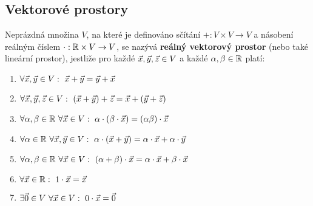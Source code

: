 \subsection{Vektorové prostory}

\begin{df}
\label{df:vekt_prostor}
Neprázdná množina $V$, na které je definováno sčítání $+:V\times V\to V$ a násobení reálným číslem $\cdot:\mathbb R\times V\rightarrow V$, se nazývá {\bf reálný vektorový prostor} (nebo také lineární prostor), jestliže pro každé $\vec{x}, \vec{y}, \vec{z}\in V$ a každé $\alpha,\beta\in\mathbb R$ platí:
\begin{enumerate}
\item $\forall\vec{x},\vec{y}\in V:~\vec{x}+\vec{y}=\vec{y}+\vec{x}$ 
\item $\forall\vec{x},\vec{y},\vec{z}\in V:~(\vec{x}+\vec{y})+\vec{z}=\vec{x}+(\vec{y}+\vec{z})$ 
\item $\forall\alpha,\beta\in\mathbb R~\forall\vec{x}\in V:~\alpha\cdot(\beta\cdot\vec{x})=(\alpha\beta)\cdot\vec{x}$ 
\item $\forall\alpha\in\mathbb R~\forall\vec{x},\vec{y}\in V:~\alpha\cdot(\vec{x}+\vec{y})=\alpha\cdot\vec{x}+\alpha\cdot\vec{y}$ 
\item $\forall\alpha,\beta\in\mathbb R~\forall\vec{x}\in V:~(\alpha+\beta)\cdot\vec{x}=\alpha\cdot\vec{x}+\beta\cdot\vec{x}$ 
\item $\forall\vec{x}\in\mathbb R:~1\cdot\vec{x}=\vec{x}$ 
\item $\exists\vec{0}\in V ~\forall\vec{x}\in V:~0\cdot\vec{x}=\vec{0}$ 
\end{enumerate}
\end{df}

